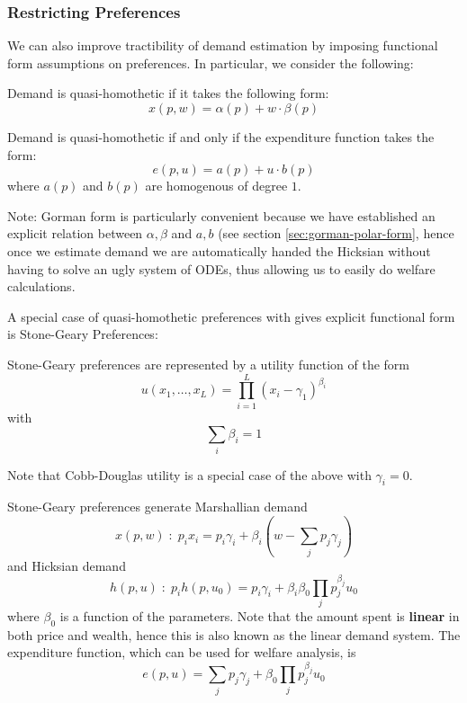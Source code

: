 \subsubsection{Restricting Preferences}
\label{sec:restr-pref}

We can also improve tractibility of demand estimation by imposing
functional form assumptions on preferences. In particular, we consider
the following:

\begin{definition}
  Demand is quasi-homothetic if it takes the following form:
  \[
  x(p,w) = \alpha(p) + w \cdot \beta(p)
  \]
\end{definition}

\begin{prop}[Gorman 1961]
  Demand is quasi-homothetic if and only if the expenditure function
  takes the form:
  \[
  e(p, u) = a(p) + u\cdot b(p)
  \]
  where $a(p)$ and $b(p)$ are homogenous of degree $1$.
\end{prop}

Note: Gorman form is particularly convenient because we have
established an explicit relation between $\alpha, \beta$ and $a,b$
(see section \ref{sec:gorman-polar-form}, hence once we estimate
demand we are automatically handed the Hicksian without having to
solve an ugly system of ODEs, thus allowing us to easily do welfare
calculations.


A special case of quasi-homothetic preferences with gives explicit
functional form is Stone-Geary Preferences:

\begin{definition}
  Stone-Geary preferences are represented by a utility function of the form
  \[
  u(x_1, \dots, x_L) = \prod_{i=1}^L(x_i - \gamma_1)^{\beta_i}
  \]
  with
  \[
  \sum_i \beta_i = 1
  \]
\end{definition}

Note that Cobb-Douglas utility is a special case of the above with
$\gamma_i = 0$.

\begin{prop}
  Stone-Geary preferences generate Marshallian demand
  \[
  x(p,w) \; : \; p_ix_i = p_i\gamma_i + \beta_i(w - \sum_j p_j\gamma_j)
  \]
  and Hicksian demand
  \[
  h(p,u) \; : \; p_ih(p, u_0) = p_i\gamma_i + \beta_i\beta_0 \prod_jp_j^{\beta_j}u_0
  \]
  where $\beta_0$ is a function of the parameters. Note that the
  amount spent is \textbf{linear} in both price and wealth, hence this
  is also known as the linear demand system. The expenditure function,
  which can be used for welfare analysis, is
  \[
  e(p,u) = \sum_j p_j\gamma_j + \beta_0 \prod_j p_j^{\beta_j}u_0
  \]
\end{prop}

